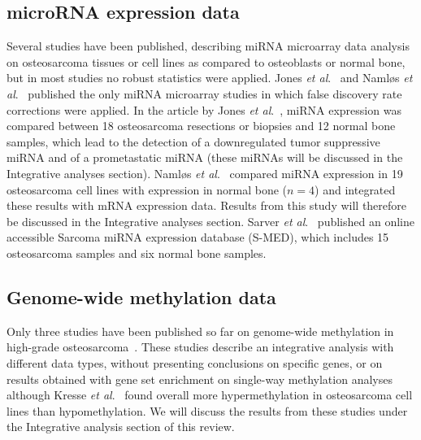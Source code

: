 \subsection{microRNA expression data}
Several studies have been published, describing miRNA
microarray data analysis on osteosarcoma tissues or cell lines
as compared to osteoblasts or normal bone, but in most studies
no robust statistics were applied. Jones {\it et al}.~\cite{jones2012mirna} and
Naml{\o}s {\it et al}.~\cite{namlos2012modulation} published the only miRNA microarray studies
in which false discovery rate corrections were applied. In
the article by Jones {\it et al}.~\cite{jones2012mirna}, miRNA expression was compared
between 18 osteosarcoma resections or biopsies and 12 normal
bone samples, which lead to the detection of a downregulated
tumor suppressive miRNA and of a prometastatic
miRNA (these miRNAs will be discussed in the Integrative %
analyses section). Naml{\o}s {\it et al}.~\cite{namlos2012modulation} compared miRNA expression
in 19 osteosarcoma cell lines with expression in normal
bone ($n=4$) and integrated these results with mRNA expression
data. Results from this study will therefore be discussed
in the Integrative analyses section. Sarver {\it et al}.~\cite{sarver2010s} published %
an online accessible Sarcoma miRNA expression database
(S-MED), which includes 15 osteosarcoma samples and six
normal bone samples.

\subsection{Genome\hyp{}wide methylation data}
Only three studies have been published so far on genome\hyp{}wide
methylation in high\hyp{}grade osteosarcoma~\cite{sadikovic2009identification,sadikovic2008vitro,kresse2012integrative}. These
studies describe an integrative analysis with different data
types, without presenting conclusions on specific genes, or on
results obtained with gene set enrichment on single\hyp{}way
methylation analyses although Kresse {\it et al}.~\cite{kresse2012integrative} found overall
more hypermethylation in osteosarcoma cell lines than hypomethylation.
We will discuss the results from these studies
under the Integrative analysis section of this review. %


